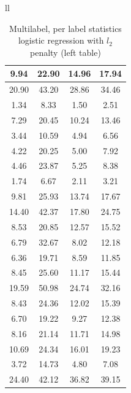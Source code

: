\documentclass{article} %
\begin{document}
\begin{table}[h]
\begin{center}
\begin{tabular}{ll}
\begin{tabular}{|c|c|c|c|}
 9.94	& 22.90	& 14.96	& 17.94	\\ \hline 
 20.90	& 43.20	& 28.86	& 34.46	\\ \hline 
 1.34	& 8.33	& 1.50	& 2.51	\\ \hline 
 7.29	& 20.45	& 10.24	& 13.46	\\ \hline 
 3.44	& 10.59	& 4.94	& 6.56	\\ \hline 
 4.22	& 20.25	& 5.00	& 7.92	\\ \hline 
 4.46	& 23.87	& 5.25	& 8.38	\\ \hline 
 1.74	& 6.67	& 2.11	& 3.21	\\ \hline 
 9.81	& 25.93	& 13.74	& 17.67	\\ \hline 
 14.40	& 42.37	& 17.80	& 24.75	\\ \hline 
 8.53	& 20.85	& 12.57	& 15.52	\\ \hline 
 6.79	& 32.67	& 8.02	& 12.18	\\ \hline 
 6.36	& 19.71	& 8.59	& 11.85	\\ \hline 
 8.45	& 25.60	& 11.17	& 15.44	\\ \hline 
 19.59	& 50.98	& 24.74	& 32.16	\\ \hline 
 8.43	& 24.36	& 12.02	& 15.39	\\ \hline 
 6.70	& 19.22	& 9.27	& 12.38	\\ \hline 
 8.16	& 21.14	& 11.71	& 14.98	\\ \hline 
 10.69	& 24.34	& 16.01	& 19.23	\\ \hline 
 3.72	& 14.73	& 4.80	& 7.08	\\ \hline 
 24.40	& 42.12	& 36.82	& 39.15	\\ \hline 
\end{tabular}
\end{tabular}
\caption{Multilabel, per label statistics logistic regression with $l_2$ penalty (left table)}
\end{center}
\end{table}

%
\end{document}

